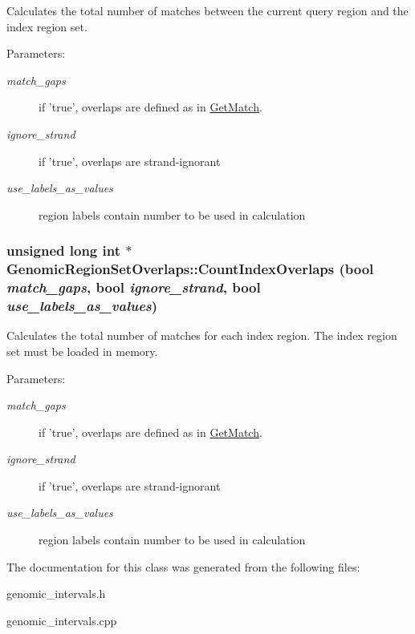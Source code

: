 Calculates the total number of matches between the current query region and the index region set. 

\begin{Desc}
\item[Parameters:]
\begin{description}
\item[{\em match\_\-gaps}]if 'true', overlaps are defined as in \hyperlink{classGenomicRegionSetOverlaps_e6d1c3bd67b0a902649aab01909a9c10}{GetMatch}. \item[{\em ignore\_\-strand}]if 'true', overlaps are strand-ignorant \item[{\em use\_\-labels\_\-as\_\-values}]region labels contain number to be used in calculation \end{description}
\end{Desc}
\hypertarget{classGenomicRegionSetOverlaps_4b004114f9868c6a077d9207bd9b1901}{
\subsubsection[CountIndexOverlaps]{\setlength{\rightskip}{0pt plus 5cm}unsigned long int $\ast$ GenomicRegionSetOverlaps::CountIndexOverlaps (bool {\em match\_\-gaps}, \/  bool {\em ignore\_\-strand}, \/  bool {\em use\_\-labels\_\-as\_\-values})}}
\label{classGenomicRegionSetOverlaps_4b004114f9868c6a077d9207bd9b1901}


Calculates the total number of matches for each index region. The index region set must be loaded in memory. 

\begin{Desc}
\item[Parameters:]
\begin{description}
\item[{\em match\_\-gaps}]if 'true', overlaps are defined as in \hyperlink{classGenomicRegionSetOverlaps_e6d1c3bd67b0a902649aab01909a9c10}{GetMatch}. \item[{\em ignore\_\-strand}]if 'true', overlaps are strand-ignorant \item[{\em use\_\-labels\_\-as\_\-values}]region labels contain number to be used in calculation \end{description}
\end{Desc}


The documentation for this class was generated from the following files:\begin{CompactItemize}
\item 
genomic\_\-intervals.h\item 
genomic\_\-intervals.cpp\end{CompactItemize}
